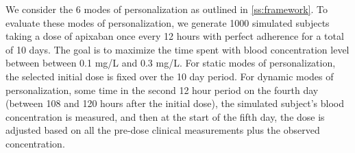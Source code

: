 
We consider the  6 modes of personalization as outlined in \cref{ss:framework}.  To evaluate these modes of personalization, we generate 1000 simulated subjects taking a dose of apixaban once every 12 hours with perfect adherence for a total of 10 days. The goal is to maximize the time spent with blood concentration level between between 0.1 mg/L and 0.3 mg/L. For static modes of personalization, the selected initial dose is fixed over the 10 day period. For dynamic modes of personalization, some time in the second 12 hour period on the fourth day (between 108 and 120 hours after the initial dose), the simulated subject’s blood concentration is measured, and then at the start of the fifth day, the dose is adjusted based on all the pre-dose clinical measurements plus the observed concentration. 

